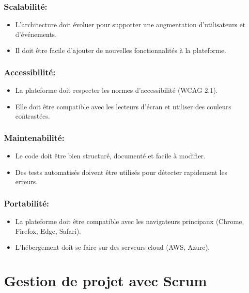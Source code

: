 \subsubsection*{Scalabilité:}
\begin{itemize}
    \item L’architecture doit évoluer pour supporter une augmentation d’utilisateurs et d’événements.
    \item Il doit être facile d'ajouter de nouvelles fonctionnalités à la plateforme.
\end{itemize}

\subsubsection*{Accessibilité:}
\begin{itemize}
    \item La plateforme doit respecter les normes d’accessibilité (WCAG 2.1).
    \item Elle doit être compatible avec les lecteurs d’écran et utiliser des couleurs contrastées.
\end{itemize}

\subsubsection*{Maintenabilité:}
\begin{itemize}
    \item Le code doit être bien structuré, documenté et facile à modifier.
    \item Des tests automatisés doivent être utilisés pour détecter rapidement les erreurs.
\end{itemize}

\subsubsection*{Portabilité:}
\begin{itemize}
    \item La plateforme doit être compatible avec les navigateurs principaux (Chrome, Firefox, Edge, Safari).
    \item L’hébergement doit se faire sur des serveurs cloud (AWS, Azure).
\end{itemize}

\section{Gestion de projet avec Scrum}


